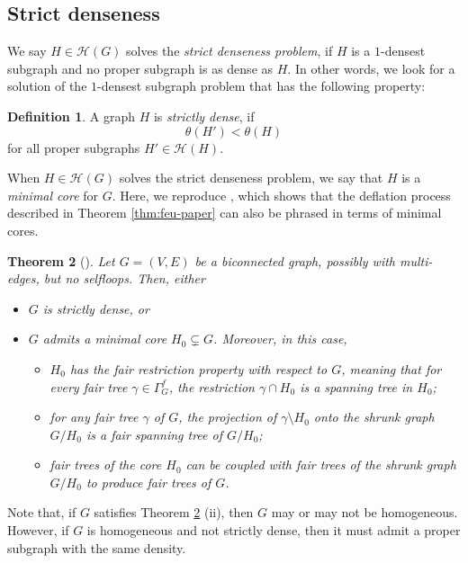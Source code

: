 \documentclass[preprint,12pt]{elsarticle}
\newtheorem{theorem}{Theorem}[section]
\theoremstyle{definition}
\newtheorem{definition}[theorem]{Definition}
\theoremstyle{remark}
\numberwithin{equation}{section}
\newcommand{\cH}{\mathcal{H}}
\newcommand{\ga}{\gamma }
\newcommand{\Ga}{\Gamma }
\newcommand{\bi}{\begin{itemize}}
\newcommand{\ei}{\end{itemize}}
\begin{document}
\subsection{Strict denseness}
We say $H\in\cH(G)$ solves the {\it strict denseness problem}, if $H$ is a $1$-densest subgraph
and no proper subgraph is as dense as $H$. In other words, we look for a solution of the $1$-densest subgraph problem that has the following property:
\begin{definition}\label{def:strictd}
A graph $H$ is {\it strictly dense}, if
\[
\theta(H')<\theta(H)
\]
for all proper subgraphs $H'\in\cH(H)$.
\end{definition}
When $H\in\cH(G)$ solves the strict denseness problem, we say that $H$ is a {\it minimal core} for $G$.
Here, we reproduce \cite[Theorem 8.1]{alpc}, which shows that the deflation process described in Theorem \ref{thm:feu-paper} can also be phrased in terms of minimal cores.
\begin{theorem}[\cite{alpc}]\label{thm:mincore}
Let $G=(V,E)$ be a biconnected graph, possibly  with multi-edges, but no selfloops. Then, either 
\bi
\item[(i)] $G$ is strictly dense, or 
\item[(ii)] $G$ admits a  minimal core $H_0\subsetneq G$. Moreover, in this case, 
\bi
\item[(a)] $H_0$ has the {\rm fair restriction property} with respect to $G$, meaning that for every fair tree $\ga\in\Ga_G^f$, the restriction $\ga\cap H_0$ is a spanning tree in $H_0$;
\item[(b)] for any fair tree $\ga$ of $G$, the projection of $\ga\setminus H_0$ onto the shrunk graph $G/H_0$ is a fair spanning tree of $G/H_0$; 
\item[(c)] fair trees of the core $H_0$ can be coupled with fair trees of the shrunk graph $G/H_0$ to produce fair trees of $G$.
\ei
\ei
\end{theorem}
Note that, if $G$ satisfies Theorem \ref{thm:mincore} (ii), then $G$ may or may not be homogeneous.
However, if $G$ is homogeneous and not strictly dense, then it must admit a proper subgraph with the same density.
\end{document}
